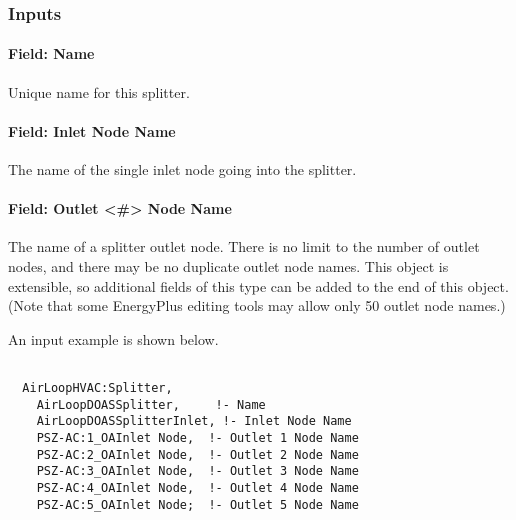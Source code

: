 \subsubsection{Inputs}\label{inputs-4-002}

\paragraph{Field: Name}\label{field-name-4-002}

Unique name for this splitter.

\paragraph{Field: Inlet Node Name}\label{field-inlet-node-name-2}

The name of the single inlet node going into the splitter.

\paragraph{Field: Outlet \textless{}\#\textgreater{} Node Name}\label{field-outlet-node-name-2}

The name of a splitter outlet node. There is no limit to the number of outlet nodes, and there may be no duplicate outlet node names.  This object is extensible, so additional fields of this type can be added to the end of this object.  (Note that some EnergyPlus editing tools may allow only 50 outlet node names.)

An input example is shown below.

\begin{lstlisting}

  AirLoopHVAC:Splitter,
    AirLoopDOASSplitter,     !- Name
    AirLoopDOASSplitterInlet, !- Inlet Node Name
    PSZ-AC:1_OAInlet Node,  !- Outlet 1 Node Name
    PSZ-AC:2_OAInlet Node,  !- Outlet 2 Node Name
    PSZ-AC:3_OAInlet Node,  !- Outlet 3 Node Name
    PSZ-AC:4_OAInlet Node,  !- Outlet 4 Node Name
    PSZ-AC:5_OAInlet Node;  !- Outlet 5 Node Name
\end{lstlisting}
